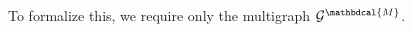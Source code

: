 \documentclass[letterpaper]{article} %
\theoremstyle{plain}
\theoremstyle{definition}
\theoremstyle{remark}
\newcommand{\todo}[1]{{\color{red}\ \!\Large\smash{\textbf{[}}{\normalsize\textsc{todo:} #1}\ \!\smash{\textbf{]}}}}
\newcommand{\V}{\mathcal V}
\newcommand{\N}{\mathcal N}
\newcommand{\Ed}{\mathcal E}
\newcommand{\dg}[1]{\mathbdcal{#1}}
\newcommand{\Gr}{\mathcal G}
\begin{document}
To formalize this, we require only the 
multigraph
$\Gr^{\dg M}$.
\end{document}
